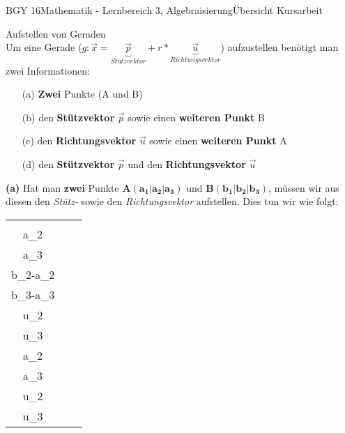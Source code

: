 \documentclass[oneside,openany,headings=optiontotoc,11pt,numbers=noenddot]{scrreprt}
\begin{document}
	\begin{worksheet}{BGY 16}{Mathematik - Lernbereich 3, Algebraisierung}{Übersicht Kursarbeit}
				
		\begin{framed}
			\noindent
			\tiny{\color{codegray}Aufstellen von Geraden}\\
			\normalcolor\normalsize
			Um eine Gerade (\(g: \vec{x} = \underbrace{\vec{p}}_{Stützvektor} + r*\underbrace{\vec{u}}_{Richtungsvektor}\)) aufzustellen benötigt man zwei Informationen:
			\begin{itemize}
				\item[\tiny{(a)}] \textbf{Zwei} Punkte (A und B)
				\item[\tiny{(b)}] den \textbf{Stützvektor} \(\vec{p}\) sowie einen \textbf{weiteren Punkt} B
				\item[\tiny{(c)}] den \textbf{Richtungsvektor} \(\vec{u}\) sowie einen \textbf{weiteren Punkt} A
				\item[\tiny{(d)}] den \textbf{Stützvektor} \(\vec{p}\) und den \textbf{Richtungsvektor} \(\vec{u}\)
			\end{itemize}
			\textbf{(a)} Hat man \textbf{zwei} Punkte \(\mathbf{A (a_1|a_2|a_3)}\) und \(\mathbf{B (b_1|b_2|b_3)}\), müssen wir aus diesen den \textit{Stütz-} sowie den \textit{Richtungsvektor} aufstellen. Dies tun wir wie folgt:\\
			\par\noindent
			\begin{tabularx}{\textwidth}{ccc}
				\(\vec{p} = \underbrace{\left(\begin{array}{c}a_1\\a_2\\a_3\end{array}\right)}_{Stützvektor}\) & \(\vec{u} = \left(\begin{array}{c}b_1-a_1\\b_2-a_2\\b_3-a_3\end{array}\right) = \underbrace{\left(\begin{array}{c}u_1\\u_2\\u_3\end{array}\right)}_{Richtungsvektor}\) & \(\Rightarrow \mathbf{g:} \vec{x} \mathbf{= \left(\begin{array}{c}a_1\\a_2\\a_3\end{array}\right) + r*\left(\begin{array}{c}u_1\\u_2\\u_3\end{array}\right)}\)

\end{tabularx}
\end{framed}
\end{worksheet}
\end{document}
